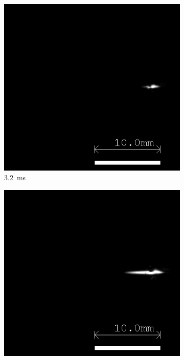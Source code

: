 \begin{figure}[h]
    \centering
    \begin{subfigure}[t]{0.3\textwidth}
        \centering
        \includegraphics[width=\textwidth]{assets/4 experiments/V1 Spark Ignition Frames/LSP142_SPRK15_Fr32.bmp}
        \caption{\qty{3.2}{ms}}
    \end{subfigure}
    \hfill
    \begin{subfigure}[t]{0.3\textwidth}
        \centering
        \includegraphics[width=\textwidth]{assets/4 experiments/V1 Spark Ignition Frames/LSP142_SPRK15_Fr33.bmp}

\end{subfigure}
\end{figure}
